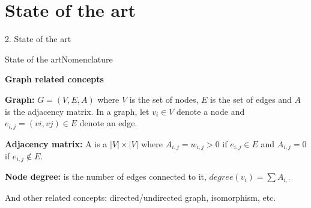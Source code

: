 \documentclass[xcolor=table]{beamer}
\begin{document}
    



\section{State of the art}
\begin{frame}{ }
\huge{2. State of the art}
\end{frame}


\begin{frame}{State of the art}{Nomenclature}

\textbf{Graph related concepts}
\vspace{15px}

\textbf{Graph:}  $G = (V,E,A)$ where $V$ is the set of nodes, $E$ is the set of edges and $A$ is the adjacency matrix. In a graph, let $ v_{i} \in V $ denote a node and $ e_{i,j} = (vi, vj) \in E $ denote an edge. 


\textbf{Adjacency matrix:} A is a $|V| \times |V|$ where $A_{i,j} = w_{i,j} > 0$ if $e_{i,j} \in E$ and $A_{i,j}=0$ if $e_{i,j} \notin E$.

\textbf{Node degree:} is the number of edges connected to it, $ degree(v_i) = \sum A_{i,:}$

And other related concepts: directed/undirected graph, isomorphism, etc.



\end{frame}
\end{document}
